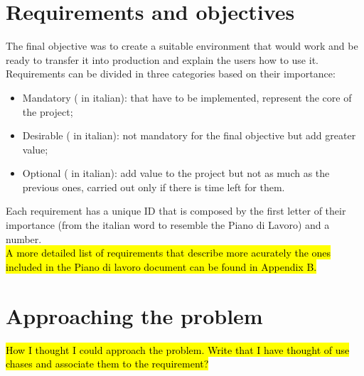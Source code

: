 \section{Requirements and objectives}
	The final objective was to create a suitable environment that would work and be ready to transfer it into production and explain the users how to use it.\\
	Requirements can be divided in three categories based on their importance:
	\begin{itemize}
		\item Mandatory ( in italian): that have to be implemented, represent the core of the project;
		\item Desirable ( in italian): not mandatory for the final objective but add greater value;
		\item Optional ( in italian): add value to the project but not as much as the previous ones, carried out only if there is time left for them.
	\end{itemize}
	Each requirement has a unique ID that is composed by the first letter of their importance (from the italian word to resemble the Piano di Lavoro) and a number.\\
	\hl{A more detailed list of requirements that describe more acurately the ones included in the Piano di lavoro document can be found in Appendix B.}

\section{Approaching the problem}

	\hl{How I thought I could approach the problem.
	Write that I have thought of use chases and associate them to the requirement?}

